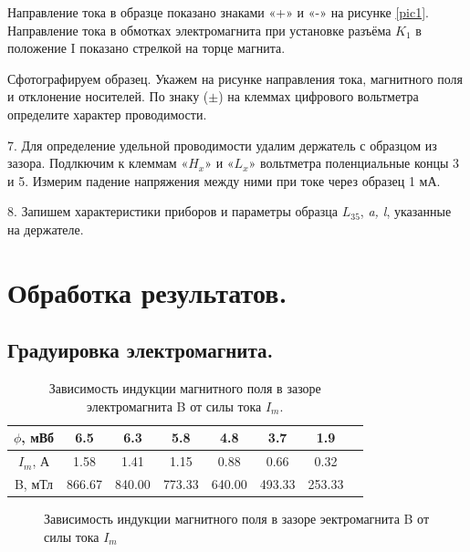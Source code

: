 \documentclass[a4paper,12pt]{article} %
\begin{document}
Направление тока в образце показано знаками «+» и «-» на рисунке \eqref{pic1}. Направление тока в обмотках электромагнита при установке разъёма $K_1$ в положение I показано стрелкой на торце магнита.

Сфотографируем образец. Укажем на рисунке направления тока, магнитного поля и отклонение носителей. По знаку ($\pm$) на клеммах цифрового вольтметра определите характер проводимости.

7. Для определение удельной проводимости удалим держатель с образцом из зазора. Подлкючим к клеммам «$H_x$» и «$L_x$» вольтметра поленциальные концы 3 и 5. Измерим падение напряжения между ними при токе через образец 1 мА.

8. Запишем характеристики приборов и параметры образца $L_{35}$, \textit{a, l}, указанные на держателе.

\section{Обработка результатов.}

\subsection{Градуировка электромагнита.}

\begin{table}[H]
\caption{\label{tab:canonsummary} Зависимость индукции магнитного поля в зазоре электромагнита B от силы тока $I_m$.}
\begin{center}
\begin{tabular}{|c|c|c|c|c|c|c|c|}
\hline
$\phi$, мВб & 6.5 & 6.3 & 5.8 & 4.8 & 3.7 & 1.9\\
\hline
$I_m$, А & 1.58 & 1.41 & 1.15 & 0.88 & 0.66 & 0.32\\
\hline
B, мТл & 866.67 & 840.00 & 773.33 & 640.00 & 493.33 & 253.33\\
\hline
\end{tabular}
\end{center}
\label{table1:ref}
\end{table}

\begin{figure}[H]\label{gr1}
 	\caption{Зависимость индукции магнитного поля в зазоре эектромагнита B от силы тока $I_m$}
\end{figure}
\end{document}
